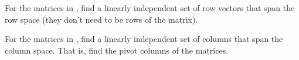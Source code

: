 \documentclass{ximera}
\begin{document}
\begin{exercise}%
    For the matrices in , find a linearly independent set of row vectors that span the row space (they don't need to be rows of the matrix).
\end{exercise}

\begin{exercise}%
    For the matrices in , find a linearly independent set of columns that span the column space. That is, find the pivot columns of the matrices.
\end{exercise}
\end{document}
